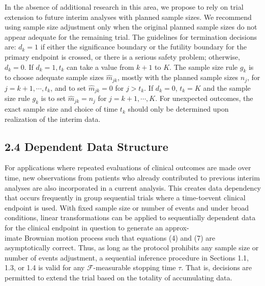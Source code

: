 \documentclass[10pt]{article}
\begin{document}
In the absence of additional research in this area, we propose to rely on trial extension to future interim analyses with planned sample sizes. We recommend using sample size adjustment only when the original planned sample sizes do not appear adequate for the remaining trial. The guidelines for termination decisions are: $d_{k}=1$ if either the significance boundary or the futility boundary for the primary endpoint is crossed, or there is a serious safety problem; otherwise, $d_{k}=0$. If $d_{k}=1, t_{k}$ can take a value from $k+1$ to $K$. The sample size rule $g_{k}$ is to choose adequate sample sizes $\hat{m}_{j k}$, mostly with the planned sample sizes $n_{j}$, for $j=k+1, \cdots, t_{k}$, and to set $\hat{m}_{j k}=0$ for $j>t_{k}$. If $d_{k}=0$, $t_{k}=K$ and the sample size rule $g_{k}$ is to set $\hat{m}_{j k}=n_{j}$ for $j=k+1, \cdots, K$. For unexpected outcomes, the exact sample size and choice of time $t_{k}$ should only be determined upon realization of the interim data.

\subsection*{2.4 Dependent Data Structure}
For applications where repeated evaluations of clinical outcomes are made over time, new observations from patients who already contributed to previous interim analyses are also incorporated in a current analysis. This creates data dependency that occurs frequently in group sequential trials where a time-toevent clinical endpoint is used. With fixed sample size or number of events and under broad conditions, linear transformations can be applied to sequentially dependent data for the clinical endpoint in question to generate an approx-\\
imate Brownian motion process such that equations (4) and (7) are asymptotically correct. Thus, as long as the protocol prohibits any sample size or number of events adjustment, a sequential inference procedure in Sections 1.1, 1.3, or 1.4 is valid for any $\mathcal{F}$-measurable stopping time $\tau$. That is, decisions are permitted to extend the trial based on the totality of accumulating data.
\end{document}
